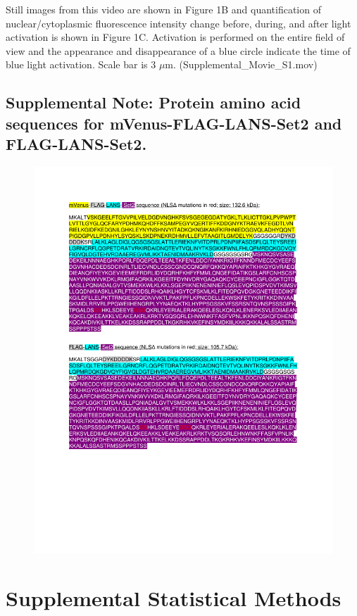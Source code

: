 \documentclass[11pt]{biorxiv}
\begin{document}
\noindent Still images from this video are shown in Figure 1B and quantification of nuclear/cytoplasmic fluorescence intensity change before, during, and after light activation is shown in Figure 1C. Activation is performed on the entire field of view and the appearance and disappearance of a blue circle indicate the time of blue light activation. Scale bar is 3 $\mu$m. (Supplemental\_Movie\_S1.mov)

\subsection{Supplemental Note: Protein amino acid sequences for mVenus-FLAG-LANS-Set2 and FLAG-LANS-Set2.}

\begin{figure}[ht!]
\center
\includegraphics[width=\textwidth, trim={0in 2in 0in 1in}, clip]{notes/Supplemental_Note.pdf}
\end{figure}

\section{Supplemental Statistical Methods}
\end{document}
